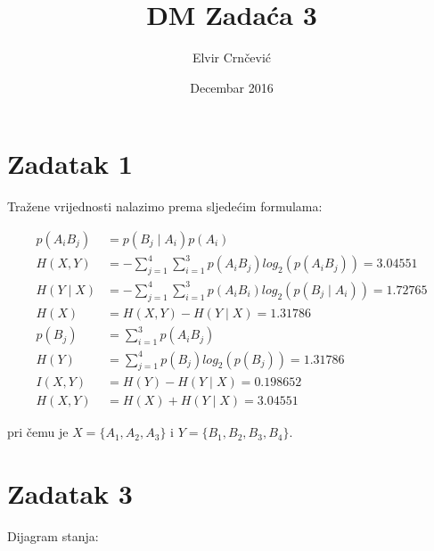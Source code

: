\documentclass{article}
\title{DM Zadaća 3}
\author{Elvir Crnčević}
\date{Decembar 2016}
\begin{document}
\pagestyle{fancy}
\maketitle

\newcommand{\overbar}[1]{\mkern 1.5mu\overline{\mkern-1.5mu#1\mkern-1.5mu}\mkern 1.5mu}
\newpage

\section*{Zadatak 1}
Tražene vrijednosti nalazimo prema sljedećim formulama:

\begin{equation*}
\begin{aligned}
p(A_i B_j) &= p (B_j \mid A_i) p(A_i) \\
H(X, Y) &= -\sum_{j = 1}^{4}\sum_{i = 1}^{3}p(A_i B_j) log_2(p(A_i B_j)) = 3.04551 \\
H(Y \mid X) &= -\sum_{j = 1}^{4}\sum_{i = 1}^{3}p(A_i B_i) log_2(p(B_j \mid A_i)) = 1.72765\\
H(X) &= H(X, Y) - H(Y \mid X) = 1.31786 \\
p(B_j) &= \sum_{i = 1}^3p(A_i B_j) \\
H(Y) &= \sum_{j = 1}^4p(B_j) log_2(p(B_j)) = 1.31786 \\
I(X, Y) &= H(Y) - H(Y \mid X) = 0.198652 \\
H(X, Y) &= H(X) + H(Y \mid X) = 3.04551
\end{aligned}
\end{equation*}

pri čemu je \(
X = \{ A_1, A_2, A_3 \}\) i
\(Y = \{ B_1, B_2, B_3, B_4 \}\).

\section*{Zadatak 3}

Dijagram stanja:
\end{document}
